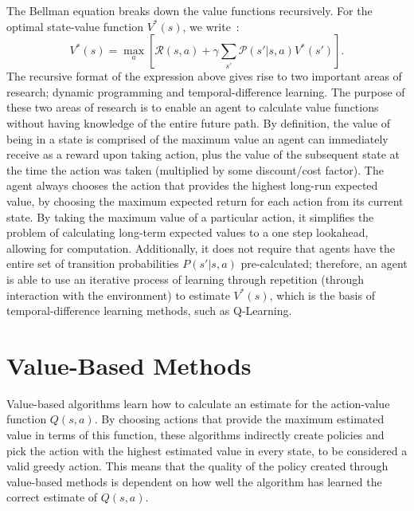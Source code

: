 The Bellman equation breaks down the value functions recursively. For the optimal state-value function $V^*(s)$, we write~\citep{bellman1957dynamic}:
\begin{equation}
    V^*(s) = \max_{a} \left[ \mathcal{R}(s,a) + \gamma \sum_{s'} \mathcal{P}(s'|s,a) V^*(s') \right].
    \label{eq:bellman}
\end{equation}
The recursive format of the expression above gives rise to two important areas of research; dynamic programming and temporal-difference learning. The purpose of these two areas of research is to enable an agent to calculate value functions without having knowledge of the entire future path. By definition, the value of being in a state is comprised of the maximum value an agent can immediately receive as a reward upon taking action, plus the value of the subsequent state at the time the action was taken (multiplied by some discount/cost factor). The agent always chooses the action that provides the highest long-run expected value, by choosing the maximum expected return for each action from its current state. By taking the maximum value of a particular action, it simplifies the problem of calculating long-term expected values to a one step lookahead, allowing for computation. Additionally, it does not require that agents have the entire set of transition probabilities $P(s'|s,a)$ pre-calculated; therefore, an agent is able to use an iterative process of learning through repetition (through interaction with the environment) to estimate $V^*(s)$, which is the basis of temporal-difference learning methods, such as Q-Learning.

\section{Value-Based Methods}
\label{sec:lit_value_based}

Value-based algorithms learn how to calculate an estimate for the action-value function $Q(s, a)$. By choosing actions that provide the maximum estimated value in terms of this function, these algorithms indirectly create policies and pick the action with the highest estimated value in every state, to be considered a valid greedy action. This means that the quality of the policy created through value-based methods is dependent on how well the algorithm has learned the correct estimate of $Q(s, a)$.

